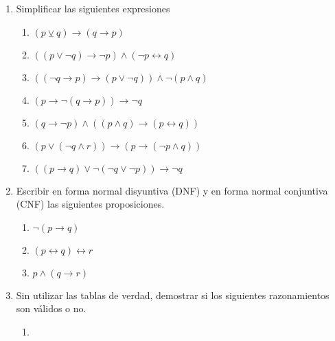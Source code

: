 \documentclass[a4paper]{article}
\newcommand{\exercise}{\item}
\newcommand{\then}{\to}
\newcommand{\eq}{\leftrightarrow}
\newcommand{\xor}{\veebar}
\newcommand{\Eq}{\Leftrightarrow}
\begin{document}
\begin{enumerate}[resume]
\begin{multicols}{2}
\begin{enumerate} [label=(\alph*)]
		\item $\neg p\then p \Eq p$
		\item $\neg p\lor \neg q \Eq (p\land q)$
		\item $(p \land \neg q) \Eq (\neg p \lor q)$
		\item $(p \then (q \lor r)) \Eq ((p \land r) \then \neg q)$
		\item $\neg (p\land q\then \neg r)	\Eq 	p\land q\lor r$
		\item $p\then (q\land r\land s) \Eq (p\then q)\land (p\then r)\land (p\then s)$
	\end{enumerate}
	\end{multicols}
	\exercise Simplificar las siguientes expresiones
	\begin{multicols}{2}
	\begin{enumerate} [label=(\alph*)]
		\item $(p \xor q) \then (q \then p)$
		\item $((p \lor \neg q) \then \neg p) \land (\neg p \eq q)$
		\item $((\neg q \then p) \then (p \lor \neg q)) \land \neg (p \land q)$
		\item $( p \then \neg (q \then p) ) \then \neg q$
		\item $(q \then \neg p) \land ((p \land q)\then(p \eq q))$
		\item $(p \lor (\neg q \land r)) \then (p \then (\neg p \land q))$
		\item $((p \then q) \lor \neg (\neg q \lor \neg p)) \then \neg q$
	\end{enumerate}
	\end{multicols}
	\exercise Escribir en forma normal disyuntiva (DNF) y en forma normal conjuntiva (CNF) las siguientes proposiciones.
	\begin{multicols}{2}
	\begin{enumerate} [label=(\alph*)]
		\item $\neg (p\then q)$
		\item $(p \eq  q) \eq r$
		\item $p \land (q \then r)$
	\end{enumerate}
	\end{multicols}
	\exercise Sin utilizar las tablas de verdad, demostrar si los siguientes razonamientos son válidos o no. 
	\begin{multicols}{3}
	\begin{enumerate} [label=(\alph*)]
		\item \Reasoning{$p\then q$ ; $r\land p$ ; $q\eq s$}{$q\land s$}

\end{enumerate}
\end{multicols}
\end{enumerate}
\end{document}
